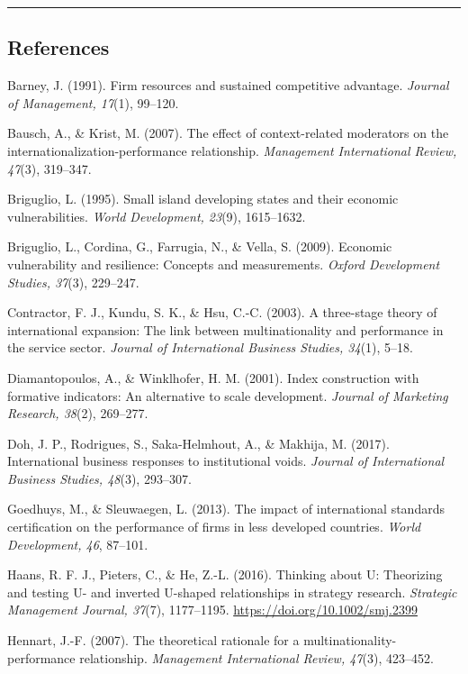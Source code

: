 \documentclass[12pt,a4paper]{article}
\begin{document}
\begin{center}\rule{0.5\linewidth}{0.5pt}\end{center}

\hypertarget{references}{%
\subsection{References}\label{references}}

Barney, J. (1991). Firm resources and sustained competitive advantage.
\emph{Journal of Management, 17}(1), 99--120.

Bausch, A., \& Krist, M. (2007). The effect of context-related
moderators on the internationalization-performance relationship.
\emph{Management International Review, 47}(3), 319--347.

Briguglio, L. (1995). Small island developing states and their economic
vulnerabilities. \emph{World Development, 23}(9), 1615--1632.

Briguglio, L., Cordina, G., Farrugia, N., \& Vella, S. (2009). Economic
vulnerability and resilience: Concepts and measurements. \emph{Oxford
Development Studies, 37}(3), 229--247.

Contractor, F. J., Kundu, S. K., \& Hsu, C.-C. (2003). A three-stage
theory of international expansion: The link between multinationality and
performance in the service sector. \emph{Journal of International
Business Studies, 34}(1), 5--18.

Diamantopoulos, A., \& Winklhofer, H. M. (2001). Index construction with
formative indicators: An alternative to scale development. \emph{Journal
of Marketing Research, 38}(2), 269--277.

Doh, J. P., Rodrigues, S., Saka-Helmhout, A., \& Makhija, M. (2017).
International business responses to institutional voids. \emph{Journal
of International Business Studies, 48}(3), 293--307.

Goedhuys, M., \& Sleuwaegen, L. (2013). The impact of international
standards certification on the performance of firms in less developed
countries. \emph{World Development, 46}, 87--101.

Haans, R. F. J., Pieters, C., \& He, Z.-L. (2016). Thinking about U:
Theorizing and testing U- and inverted U-shaped relationships in
strategy research. \emph{Strategic Management Journal, 37}(7),
1177--1195. \url{https://doi.org/10.1002/smj.2399}

Hennart, J.-F. (2007). The theoretical rationale for a
multinationality-performance relationship. \emph{Management
International Review, 47}(3), 423--452.
\end{document}
